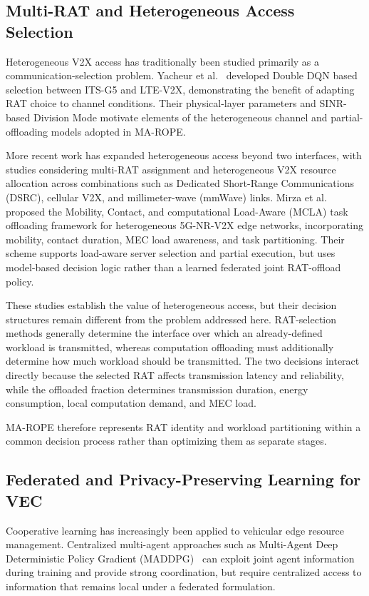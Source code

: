 \subsection{Multi-RAT and Heterogeneous Access Selection}

Heterogeneous V2X access has traditionally been studied primarily as a communication-selection problem. Yacheur et al.~\cite{yacheur2023} developed Double DQN based selection between ITS-G5 and LTE-V2X, demonstrating the benefit of adapting RAT choice to channel conditions. Their physical-layer parameters and SINR-based Division Mode motivate elements of the heterogeneous channel and partial-offloading models adopted in MA-ROPE.

More recent work has expanded heterogeneous access beyond two interfaces, with studies considering multi-RAT assignment and heterogeneous V2X resource allocation across combinations such as Dedicated Short-Range Communications (DSRC), cellular V2X, and millimeter-wave (mmWave) links. Mirza et al.~\cite{mirza2023} proposed the Mobility, Contact, and computational Load-Aware (MCLA) task offloading framework for heterogeneous 5G-NR-V2X edge networks, incorporating mobility, contact duration, MEC load awareness, and task partitioning. Their scheme supports load-aware server selection and partial execution, but uses model-based decision logic rather than a learned federated joint RAT-offload policy.

These studies establish the value of heterogeneous access, but their decision structures remain different from the problem addressed here. RAT-selection methods generally determine the interface over which an already-defined workload is transmitted, whereas computation offloading must additionally determine how much workload should be transmitted. The two decisions interact directly because the selected RAT affects transmission latency and reliability, while the offloaded fraction determines transmission duration, energy consumption, local computation demand, and MEC load.

MA-ROPE therefore represents RAT identity and workload partitioning within a common decision process rather than optimizing them as separate stages.

\subsection{Federated and Privacy-Preserving Learning for VEC}

Cooperative learning has increasingly been applied to vehicular edge resource management. Centralized multi-agent approaches such as Multi-Agent Deep Deterministic Policy Gradient (MADDPG)~\cite{lowe2017} can exploit joint agent information during training and provide strong coordination, but require centralized access to information that remains local under a federated formulation.


